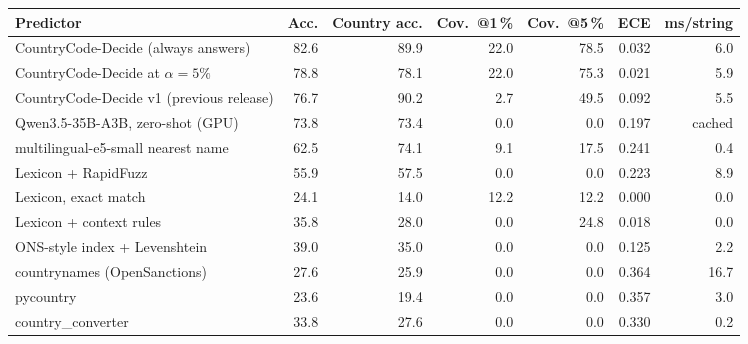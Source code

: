 \begin{tabular}{lrrrrrr}
\toprule
Predictor & Acc. & Country acc. & Cov.\ @1\,\% & Cov.\ @5\,\% & ECE & ms/string \\
\midrule
CountryCode-Decide (always answers) & 82.6 & 89.9 & 22.0 & 78.5 & 0.032 & 6.0 \\
CountryCode-Decide at $\alpha = 5\%$ & 78.8 & 78.1 & 22.0 & 75.3 & 0.021 & 5.9 \\
CountryCode-Decide v1 (previous release) & 76.7 & 90.2 & 2.7 & 49.5 & 0.092 & 5.5 \\
\midrule
Qwen3.5-35B-A3B, zero-shot (GPU) & 73.8 & 73.4 & 0.0 & 0.0 & 0.197 & cached \\
multilingual-e5-small nearest name & 62.5 & 74.1 & 9.1 & 17.5 & 0.241 & 0.4 \\
Lexicon + RapidFuzz & 55.9 & 57.5 & 0.0 & 0.0 & 0.223 & 8.9 \\
Lexicon, exact match & 24.1 & 14.0 & 12.2 & 12.2 & 0.000 & 0.0 \\
Lexicon + context rules & 35.8 & 28.0 & 0.0 & 24.8 & 0.018 & 0.0 \\
ONS-style index + Levenshtein & 39.0 & 35.0 & 0.0 & 0.0 & 0.125 & 2.2 \\
countrynames (OpenSanctions) & 27.6 & 25.9 & 0.0 & 0.0 & 0.364 & 16.7 \\
pycountry & 23.6 & 19.4 & 0.0 & 0.0 & 0.357 & 3.0 \\
country\_converter & 33.8 & 27.6 & 0.0 & 0.0 & 0.330 & 0.2 \\
\bottomrule
\end{tabular}
